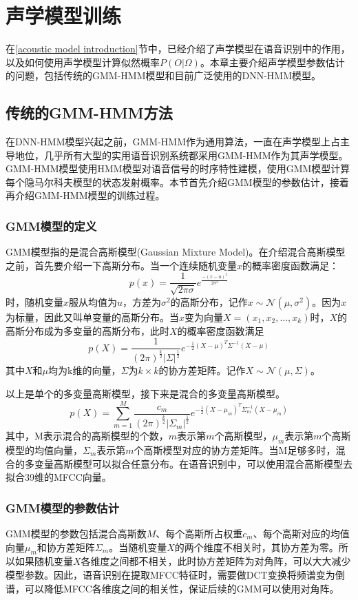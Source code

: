 
\chapter{声学模型训练}
在\ref{acoustic model introduction}节中，已经介绍了声学模型在语音识别中的作用，以及如何使用声学模型计算似然概率$P(O|\Omega)$。本章主要介绍声学模型参数估计的问题，包括传统的GMM-HMM模型和目前广泛使用的DNN-HMM模型。
\section{传统的GMM-HMM方法}
在DNN-HMM模型兴起之前，GMM-HMM作为通用算法，一直在声学模型上占主导地位，几乎所有大型的实用语音识别系统都采用GMM-HMM作为其声学模型。GMM-HMM模型使用HMM模型对语音信号的时序特性建模，使用GMM模型计算每个隐马尔科夫模型的状态发射概率。本节首先介绍GMM模型的参数估计，接着再介绍GMM-HMM模型的训练过程。
\subsection{GMM模型的定义}
GMM模型指的是混合高斯模型(Gaussian Mixture Model)。在介绍混合高斯模型之前，首先要介绍一下高斯分布。当一个连续随机变量$x$的概率密度函数满足：\begin{equation}p(x)=\frac{1}{\sqrt{2\pi\sigma}}e^{\frac{-(x-u)^2}{2\sigma^2}}\end{equation}时，随机变量$x$服从均值为$u$，方差为$\sigma^2$的高斯分布，记作$x\sim \mathcal{N}(\mu,\sigma^2)$。因为$x$为标量，因此又叫单变量的高斯分布。当$x$变为向量$X=(x_1,x_2,...,x_k)$时，$X$的高斯分布成为多变量的高斯分布，此时$X$的概率密度函数满足\begin{equation}p(X)=\frac{1}{(2\pi)^{\frac{k}{2}}|\Sigma|^{\frac{1}{2}}}e^{-\frac{1}{2}(X-\mu)^T\Sigma^{-1}(X-\mu)} \end{equation}
其中$X$和$\mu$均为k维的向量，$\Sigma$为$k\times k$的协方差矩阵。记作$X\sim \mathcal{N}(\mu,\Sigma)$。

以上是单个的多变量高斯模型，接下来是混合的多变量高斯模型。
\begin{equation}p(X)=\sum_{m=1}^M \frac{c_m}{(2\pi)^{\frac{k}{2}}|\Sigma_m|^{\frac{1}{2}}}e^{-\frac{1}{2}(X-\mu_m)^T\Sigma_m^{-1}(X-\mu_m)}\end{equation} 其中，M表示混合的高斯模型的个数，$m$表示第$m$个高斯模型，$\mu_m$表示第$m$个高斯模型的均值向量，$\Sigma_m$表示第$m$个高斯模型对应的协方差矩阵。当M足够多时，混合的多变量高斯模型可以拟合任意分布。在语音识别中，可以使用混合高斯模型去拟合39维的MFCC向量。
\subsection{GMM模型的参数估计}\label{acousticmodel}
GMM模型的参数包括混合高斯数$M$、每个高斯所占权重$c_m$、每个高斯对应的均值向量$\mu_m$和协方差矩阵$\Sigma_m$。当随机变量$X$的两个维度不相关时，其协方差为零。所以如果随机变量$X$各维度之间都不相关，此时协方差矩阵为对角阵，可以大大减少模型参数。因此，语音识别在提取MFCC特征时，需要做DCT变换将频谱变为倒谱，可以降低MFCC各维度之间的相关性，保证后续的GMM可以使用对角阵。

